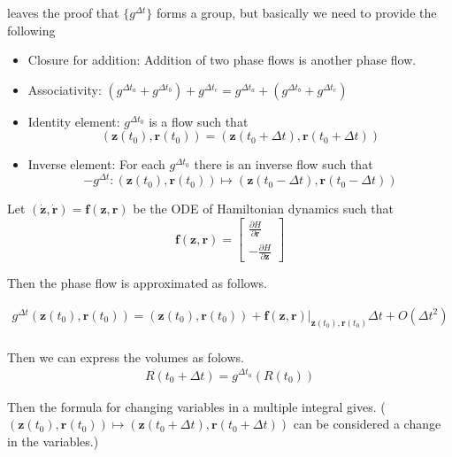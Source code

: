 \documentclass[a4]{article}
\begin{document}
\cite{arnold_1989} leaves the proof that $\{g^{{\Delta}t}\}$ forms a group, but
basically we need to provide the following
\begin{itemize}
\item Closure for addition:  Addition of two phase flows is another phase flow.
\item Associativity: $(g^{{\Delta}t_a} + g^{{\Delta}t_b}) +  g^{{\Delta}t_c} = 
        g^{{\Delta}t_a} +  (g^{{\Delta}t_b} +  g^{{\Delta}t_c})$
\item Identity element: $g^{{\Delta}t_0}$ is a flow such that
$$ (\bm{z}(t_0), \bm{r}(t_0)) = (\bm{z}(t_0 + {\Delta}t), \bm{r}(t_0 + {\Delta}t))$$
\item Inverse element: For each $g^{{\Delta}t_0}$ there is an inverse flow
such that
$$ -g^{{\Delta}t}: (\bm{z}(t_0), \bm{r}(t_0)) \mapsto 
(\bm{z}(t_0 - {\Delta}t), \bm{r}(t_0 - {\Delta}t))$$
\end{itemize}

Let $(\dot{\bm{z}}, \dot{\bm{r}}) = \bm{f}(\bm{z}, \bm{r})$ be the ODE of
Hamiltonian dynamics such that
\begin{equation}
\bm{f}(\bm{z}, \bm{r}) = \left[
\begin{array}{c}
    \frac{\partial H}{\partial \bm{r} }\\
    \hline
    - \frac{\partial H}{\partial \bm{z} }
    \end{array}\right]\label{eq:hmc_def_f}
\end{equation}


Then the phase flow is approximated as follows.

\begin{equation}
\begin{aligned}
g^{{\Delta}t}(\bm{z}(t_0), \bm{r}(t_0)) = (\bm{z}(t_0), \bm{r}(t_0)) + \bm{f}(\bm{z}, \bm{r})|_{\bm{z}(t_0),\bm{r}(t_0)}{\Delta}t + O({\Delta}t^2)\label{eq:hamiltonioan_ode}\\
\end{aligned}
\end{equation}

Then we can express the volumes as folows.
\begin{equation}
\begin{aligned}
R(t_0 + {\Delta}t) = g^{{\Delta}t_a}( R(t_0) )
\end{aligned}
\end{equation}

Then the formula for changing variables in a multiple integral gives.
(
$(\bm{z}(t_0), \bm{r}(t_0)) \mapsto 
(\bm{z}(t_0 + {\Delta}t), \bm{r}(t_0 + {\Delta}t))$ can be considered
a change in the variables.)
\end{document}
